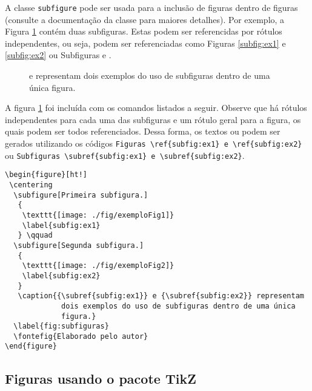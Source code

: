 A classe \verb|subfigure| pode ser usada para a inclusão de figuras dentro de figuras (consulte a documentação da classe para maiores detalhes). Por exemplo, a Figura \ref{fig:subfiguras} contém duas subfiguras. Estas podem ser referencidas por rótulos independentes, ou seja, podem ser referenciadas como Figuras \ref{subfig:ex1} e \ref{subfig:ex2} ou Subfiguras  e .
\begin{figure}[ht!]
 \centering
   \qquad
   \caption{{} e {} representam dois exemplos do uso de subfiguras dentro de uma única figura.}
  \label{fig:subfiguras}
\end{figure}

A figura \ref{fig:subfiguras} foi incluída com os comandos listados a seguir. Observe que há rótulos independentes para cada uma das subfiguras e um rótulo geral para a figura, os quais podem ser todos referenciados. Dessa forma, os textos  ou  podem ser gerados utilizando os códigos \verb|Figuras \ref{subfig:ex1} e \ref{subfig:ex2}| ou \verb|Subfiguras \subref{subfig:ex1} e \subref{subfig:ex2}|.

\begin{verbatim}
\begin{figure}[ht!]
 \centering
  \subfigure[Primeira subfigura.]
   {
    \texttt{[image: ./fig/exemploFig1]}
    \label{subfig:ex1}
   } \qquad
  \subfigure[Segunda subfigura.]
   {
    \texttt{[image: ./fig/exemploFig2]}
    \label{subfig:ex2}
   }
   \caption{{\subref{subfig:ex1}} e {\subref{subfig:ex2}} representam
             dois exemplos do uso de subfiguras dentro de uma única
             figura.}
  \label{fig:subfiguras}
  \fontefig{Elaborado pelo autor}
\end{figure}
\end{verbatim}

\subsection{Figuras usando o pacote TikZ}

